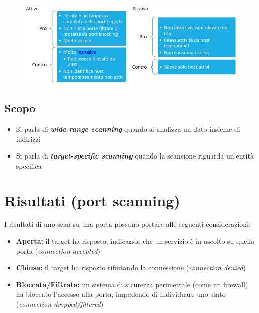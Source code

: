 \begin{figure}[H]
    \centering
    \includegraphics[width=1\linewidth]{chapters/9/images/attivo-passivo.png}
\end{figure}

\subsection{Scopo}
\begin{itemize}
    \item Si parla di \textbf{\textit{wide range scanning}} quando si analizza un 
    dato insieme di indirizzi 
    \item Si parla di \textbf{\textit{target-specific scanning}} quando la scansione 
    riguarda un'entità specifica
\end{itemize}

\section{Risultati (port scanning)}
I risultati di uno scan su una porta possono portare alle seguenti considerazioni:
\begin{itemize}
    \item \textbf{Aperta:} il target ha risposto, indicando che un servizio è in ascolto 
    su quella porta (\textit{connection accepted})
    \item \textbf{Chiusa:} il target ha risposto rifiutando la connessione (\textit{connection denied})
    \item \textbf{Bloccata/Filtrata:} un sistema di sicurezza perimetrale (come un firewall) ha 
    bloccato l'accesso alla porta, impedendo di individuare uno stato (\textit{connection dropped/filtered})
\end{itemize}

